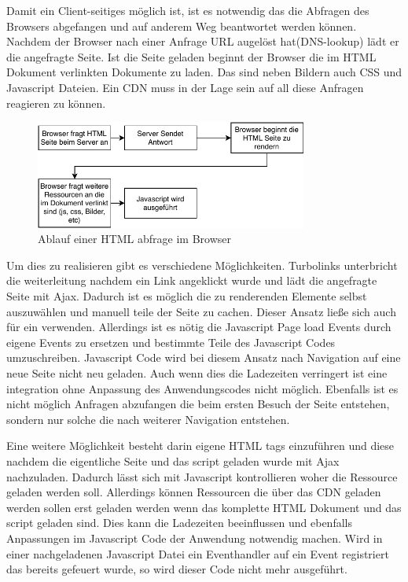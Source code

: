 Damit ein Client-seitiges \cdn möglich ist, ist es notwendig das die Abfragen des Browsers abgefangen und auf anderem Weg beantwortet werden können. Nachdem der Browser nach einer Anfrage URL augelöst hat(DNS-lookup) lädt er die angefragte Seite. Ist die Seite geladen beginnt der Browser die im HTML Dokument verlinkten Dokumente zu laden. Das sind neben Bildern auch CSS und Javascript Dateien. Ein CDN muss in der Lage sein auf all diese Anfragen reagieren zu können.

\begin{figure}[!h]
	\centering
	\includegraphics[width=0.8\textwidth]{figures/browser_abfrage}
	\caption[A Figure Short-Title]{Ablauf einer HTML abfrage im Browser}
	\label{fig:browser_abfrage}
\end{figure}


Um dies zu realisieren gibt es verschiedene Möglichkeiten. Turbolinks unterbricht die weiterleitung nachdem ein Link angeklickt wurde und lädt die angefragte Seite mit Ajax. Dadurch ist es möglich die zu renderenden Elemente selbst auszuwählen und manuell teile der Seite zu cachen. Dieser Ansatz ließe sich auch für ein \cdn verwenden. Allerdings ist es nötig die Javascript Page load Events durch eigene Events zu ersetzen und bestimmte Teile des Javascript Codes umzuschreiben. Javascript Code wird bei diesem Ansatz nach Navigation auf eine neue Seite nicht neu geladen. Auch wenn dies die Ladezeiten verringert ist eine integration ohne Anpassung des Anwendungscodes nicht möglich. Ebenfalls ist es nicht möglich Anfragen abzufangen die beim ersten Besuch der Seite entstehen, sondern nur solche die nach weiterer Navigation entstehen.

Eine weitere Möglichkeit besteht darin eigene HTML tags einzuführen und diese nachdem die eigentliche Seite und das \cdn script geladen wurde mit Ajax nachzuladen. Dadurch lässt sich mit Javascript kontrollieren woher die Ressource geladen werden soll. Allerdings können Ressourcen die über das \pTp CDN geladen werden sollen erst geladen werden wenn das komplette HTML Dokument und das \cdn script geladen sind. Dies kann die Ladezeiten beeinflussen und ebenfalls Anpassungen im Javascript Code der Anwendung notwendig machen. Wird in einer nachgeladenen Javascript Datei ein Eventhandler auf ein Event registriert das bereits gefeuert wurde, so wird dieser Code nicht mehr ausgeführt. 

